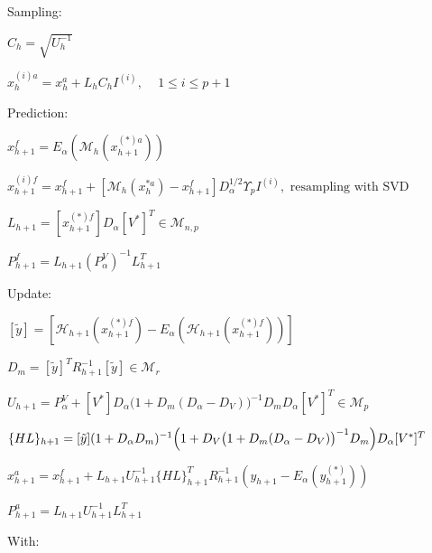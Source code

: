   \begin{DoxyEnumerate}
\item \-Sampling\-:
\begin{DoxyItemize}
\item $ C_{h} = \sqrt{U_h^{-1}} $\par

\item $ x_{h}^{(i)a} = x_h^a + L_hC_hI^{(i)} \textrm{, } \quad 1\leq i \leq p+1 $\par

\end{DoxyItemize}
\item \-Prediction\-:
\begin{DoxyItemize}
\item $ x_{h+1}^f = E_\alpha(\mathcal{M}_{h}(x_{h+1}^{(*)a})) $\par

\item $ x_{h+1}^{(i)f} = x_{h+1}^f + [\mathcal{M}_{h}(x_{h}^{*a}) - x_{h+1}^f]D_{\alpha}^{1/2} \Upsilon_p I^(i), \textrm{ resampling with SVD} $\par

\item $ L_{h+1} = [x_{h+1}^{(*)f}]D_\alpha [V^*]^T \in \mathcal{M}_{n,p} $\par

\item $ P_{h+1}^f = L_{h+1} (P_{\alpha}^V)^{-1} L_{h+1}^T $
\end{DoxyItemize}
\item \-Update\-:
\begin{DoxyItemize}
\item $ [\tilde{y}] = [\mathcal{H}_{h+1}(x_{h+1}^{(*)f}) - E_\alpha(\mathcal{H}_{h+1}(x_{h+1}^{(*)f})) ]$\par

\item $ D_m = [\tilde{y}]^T R_{h+1}^{-1}[\tilde{y}] \in \mathcal{M}_r $\par

\item $ U_{h+1} = P_{\alpha}^V + [V^*] D_\alpha \bigl(1 + D_m(D_\alpha - D_V)\bigr)^{-1} D_m D_\alpha [V^*]^T \in \mathcal{M}_{p} $\par

\item $ \{HL\}_{h+1} = [\tilde{y}]( 1 + D_\alpha D_m)^{-1}\Bigl(1 + D_V \bigl( 1+D_m (D_\alpha-D_V) \bigr)^{-1} D_m \Bigr) D_\alpha[V^*]^T $\par

\item $ x_{h+1}^a = x_{h+1}^f + L_{h+1}U_{h+1}^{-1}\{HL\}_{h+1}^T R_{h+1}^{-1} (y_{h+1}-E_\alpha(y_{h+1}^{(*)}))$\par

\item $ P_{h+1}^a = L_{h+1} U_{h+1}^{-1} L_{h+1}^T$
\end{DoxyItemize}
\end{DoxyEnumerate}\-With\-: \par
